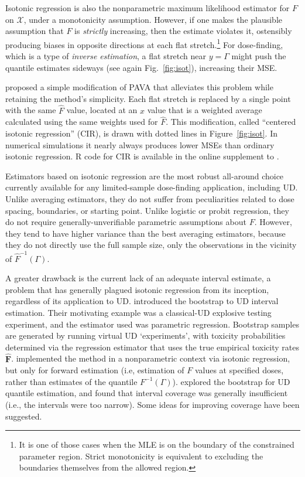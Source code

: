  Isotonic regression is also the nonparametric maximum likelihood estimator for $F$ on $\mathcal{X}$, under a monotonicity assumption. However, if one makes the plausible assumption that $F$ is \emph{strictly} increasing, then the estimate violates it, ostensibly producing biases in opposite directions at each flat stretch.\footnote{It is one of those cases when the MLE is on the boundary of the constrained parameter region. Strict monotonicity is equivalent to excluding the boundaries themselves from the allowed region.} For dose-finding, which is a type of \emph{inverse estimation}, a flat stretch near $y=\Gamma$ might push the quantile estimates sideways (see again Fig.~\ref{fig:isot}), increasing their MSE. 
 
 \cite{Oron07} proposed a simple modification of PAVA that alleviates this problem while retaining the method's simplicity. Each flat stretch is replaced by a single point with the same $\hat{F}$ value, located at an $x$ value that is a weighted average calculated using the same weights used for $\hat{F}$. This modification, called ``centered isotonic regression'' (CIR), is drawn with dotted lines in Figure~\ref{fig:isot}. In numerical simulations it nearly always produces lower MSEs than ordinary isotonic regression. R code for CIR is available in the online supplement to \cite{Oron:Hoff:smal:2013}.

Estimators based on isotonic regression are the most robust all-around choice currently available for any limited-sample dose-finding application, including UD. Unlike averaging estimators, they do not suffer from peculiarities related to dose spacing, boundaries, or starting point. Unlike logistic or probit regression, they do not require generally-unverifiable parametric assumptions about $F$. However, they tend to have higher variance than the best averaging estimators, because they do not directly use the full sample size, only the observations in the vicinity of $\hat{F}^{-1}(\Gamma)$.

A greater drawback is the current lack of an adequate interval estimate, a problem that has generally plagued isotonic regression from its inception, regardless of its application to UD. \cite{Chao:Fuh:boot:2001} introduced the bootstrap to UD interval estimation. Their motivating example was a classical-UD explosive testing experiment, and the estimator used was parametric regression. Bootstrap samples are generated by running virtual UD `experiments', with toxicity probabilities determined via the regression estimator that uses the true empirical toxicity rates $\mathbf{\hat{F}}$.  \cite{Styl:Pros:Flou:esti:2003} implemented the method in a nonparametric context via isotonic regression, but only for forward estimation (i.e, estimation of $F$ values at specified doses, rather than estimates of the quantile $F^{-1}(\Gamma)$). \cite{Oron07} explored the bootstrap for UD quantile estimation, and found that interval coverage was generally insufficient (i.e., the intervals were too narrow). Some ideas for improving coverage have been suggested.



